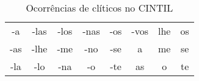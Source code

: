 \begin{table}[]
    \centering
    \begin{tabular}{|c|c|c|c|c|c|c|c|}
    \hline
    -a & -las & -los & -nas & -os & -vos & lhe & os\\
    -as & -lhe & -me & -no & -se & a & me & se\\
    -la & -lo & -na & -o & -te & as & o & te\\
    \hline
    \end{tabular}
    \caption{Ocorrências de clíticos no CINTIL}
    \label{tab:cliticos_cintil}
\end{table}